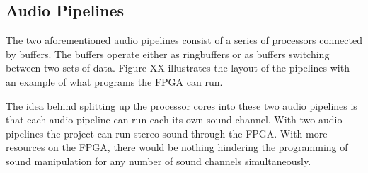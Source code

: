 \FloatBarrier
\subsection{Audio Pipelines}\label{sec:audio_pipelines}


The two aforementioned audio pipelines consist of a series of processors
connected by buffers. The buffers operate either as ringbuffers or as buffers
switching between two sets of data. Figure XX illustrates the layout of the pipelines with an example of what programs the
FPGA can run.

The idea behind splitting up the processor cores into these two audio pipelines
is that each audio pipeline can run each its own sound channel. With two
audio pipelines the project can run stereo sound through the FPGA. With more
resources on the FPGA, there would be nothing hindering the programming of
sound manipulation for any number of sound channels simultaneously.


